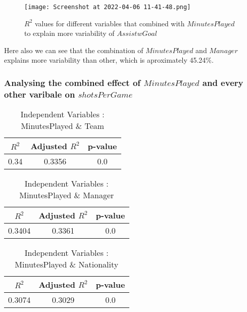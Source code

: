 \documentclass[12pt]{article}
\begin{document}
\begin{figure}[H]
	\centering
	\texttt{[image: Screenshot at 2022-04-06 11-41-48.png]}
	\caption{ $ R^2 $ values for different variables that combined with $ MinutesPlayed $ to explain more variability of $ AssistwGoal $}
	\label{fig:1}
	\label{var2AG}
\end{figure} 

Here also we can see that the combination of $ MinutesPlayed $ and $ Manager $ explains more variability than other, which is aproximately 45.24\%.

\newpage
\subsubsection{Analysing the combined effect of $ MinutesPlayed $ and every other varibale on $ shotsPerGame $}
\begin{minipage}{0.4\textwidth}
	\begin{table}[H]
		\centering
		\caption{Independent Variables : MinutesPlayed \& Team}\label{table:1a}
		{\begin{tabular}{|c|c|c|}
				\hline
				$ R^2 $ & Adjusted $ R^2 $ & p-value \\
				\hline
				0.34 & 0.3356 & 0.0 \\
				\hline
			\end{tabular}
		}
	\end{table}
\end{minipage}
\hfill
\begin{minipage}{0.4\textwidth}
	\begin{table}[H]
		\centering
		\caption{Independent Variables : MinutesPlayed \& Manager}\label{table:1a}
		{\begin{tabular}{|c|c|c|}
				\hline
				$ R^2 $ & Adjusted $ R^2 $ & p-value \\
				\hline
				0.3404 & 0.3361 & 0.0 \\
				\hline
			\end{tabular}
		}
	\end{table}
\end{minipage}
\hfill
\begin{minipage}{0.4\textwidth}
	\begin{table}[H]
		\centering
		\caption{Independent Variables : MinutesPlayed \& Nationality}\label{table:1a}
		{\begin{tabular}{|c|c|c|}
				\hline
				$ R^2 $ & Adjusted $ R^2 $ & p-value \\
				\hline
				0.3074 & 0.3029 & 0.0 \\
				\hline
			\end{tabular}
		}
	\end{table}
\end{minipage}
\end{document}
